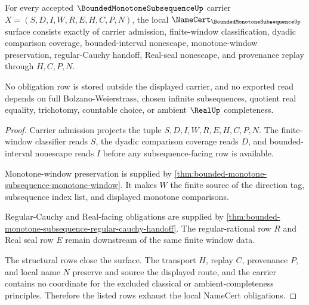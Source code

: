 \begin{theorem}
\label{thm:bounded-monotone-subsequence-namecert-obligations}
For every accepted $\BoundedMonotoneSubsequenceUp$ carrier $X=(S,D,I,W,R,E,H,C,P,N)$, the local $\NameCert_{\BoundedMonotoneSubsequenceUp}$ surface consists exactly of carrier admission, finite-window classification, dyadic comparison coverage, bounded-interval nonescape, monotone-window preservation, regular-Cauchy handoff, Real-seal nonescape, and provenance replay through $H,C,P,N$.

No obligation row is stored outside the displayed carrier, and no exported read depends on full Bolzano-Weierstrass, chosen infinite subsequences, quotient real equality, trichotomy, countable choice, or ambient $\RealUp$ completeness.
\end{theorem}
\begin{proof}
Carrier admission projects the tuple $S,D,I,W,R,E,H,C,P,N$. The finite-window classifier reads $S$, the dyadic comparison coverage reads $D$, and bounded-interval nonescape reads $I$ before any subsequence-facing row is available.

Monotone-window preservation is supplied by \autoref{thm:bounded-monotone-subsequence-monotone-window}. It makes $W$ the finite source of the direction tag, subsequence index list, and displayed monotone comparisons.

Regular-Cauchy and Real-facing obligations are supplied by \autoref{thm:bounded-monotone-subsequence-regular-cauchy-handoff}. The regular-rational row $R$ and Real seal row $E$ remain downstream of the same finite window data.

The structural rows close the surface. The transport $H$, replay $C$, provenance $P$, and local name $N$ preserve and source the displayed route, and the carrier contains no coordinate for the excluded classical or ambient-completeness principles. Therefore the listed rows exhaust the local NameCert obligations.
\end{proof}



